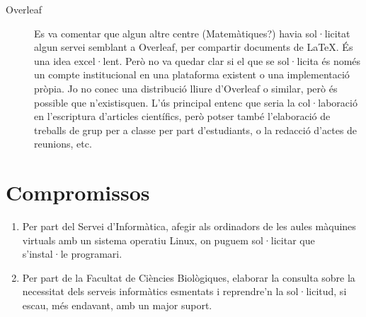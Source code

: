 \documentclass[a4paper,12pt]{article}
\begin{document}
\begin{description}
   \item[Overleaf] Es va comentar que algun altre centre (Matemàtiques?) havia sol·licitat
algun servei semblant a Overleaf, per compartir documents de \LaTeX. És una idea excel·lent.
Però no va quedar clar si el que se sol·licita és només un compte institucional en una plataforma
existent o una implementació pròpia. Jo no conec una distribució lliure d'Overleaf o similar,
però és possible que n'existisquen. L'ús principal entenc que seria la col·laboració en l'escriptura
d'articles científics, però potser també l'elaboració de treballs de grup per a classe
per part d'estudiants, o la redacció d'actes de reunions, etc.
\end{description}

\section{Compromissos}
\begin{enumerate}
\item Per part del Servei d'Informàtica, afegir als ordinadors de les aules màquines virtuals 
amb un sistema operatiu Linux, on puguem sol·licitar que s'instal·le programari.
\item Per part de la Facultat de Ciències Biològiques, elaborar la consulta sobre la
necessitat dels serveis informàtics esmentats i reprendre'n la sol·licitud, si escau,
més endavant, amb un major suport.
\end{enumerate}
\end{document}
